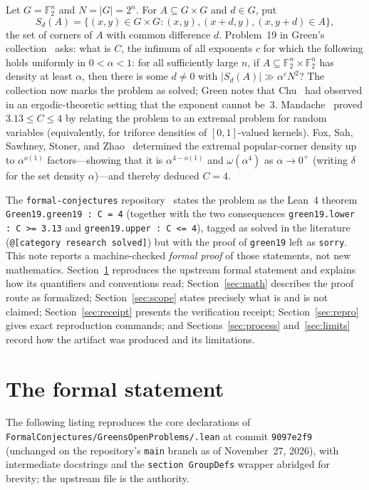 \documentclass[11pt,reqno]{amsart}
\theoremstyle{remark}
\newcommand{\F}{\mathbb{F}}
\newcommand{\LeanUS}{\textunderscore\hspace{0pt}}
\newcommand{\lean}[1]{{\let\_\LeanUS\texttt{#1}}}
\begin{document}
Let $G = \F_2^n$ and $N = |G| = 2^n$. For $A \subseteq G \times G$ and $d \in G$, put
\[
  S_d(A) = \{(x, y) \in G \times G : (x, y), (x + d, y), (x, y + d) \in A\},
\]
the set of corners of $A$ with common difference $d$. Problem~19 in Green's collection~\cite{Green} asks: what is $C$, the infimum of all exponents $c$ for which the following holds uniformly in $0 < \alpha < 1$: for all sufficiently large $n$, if $A \subseteq \F_2^n \times \F_2^n$ has density at least $\alpha$, then there is some $d \neq 0$ with $|S_d(A)| \gg \alpha^c N^2$? The collection now marks the problem as solved; Green notes that Chu~\cite{Chu} had observed in an ergodic-theoretic setting that the exponent cannot be~$3$. Mandache~\cite{Mandache} proved $3.13 \le C \le 4$ by relating the problem to an extremal problem for random variables (equivalently, for triforce densities of $[0, 1]$-valued kernels). Fox, Sah, Sawhney, Stoner, and Zhao~\cite{FSSSZ} determined the extremal popular-corner density up to $\alpha^{o(1)}$ factors---showing that it is $\alpha^{4 - o(1)}$ and $\omega(\alpha^4)$ as $\alpha \to 0^+$ (writing $\delta$ for the set density $\alpha$)---and thereby deduced $C = 4$.

The \lean{formal-conjectures} repository~\cite{FC} states the problem as the Lean~4 theorem \lean{Green19.\allowbreak{}\allowbreak green\_19 : C = 4} (together with the two consequences \lean{green\_19.\allowbreak{}lower : C >= 3.13} and \lean{green\_19.\allowbreak{}upper : C <= 4}), tagged as solved in the literature (\lean{@[category research solved]}) but with the proof of \lean{green\_19} left as \lean{sorry}. This note reports a machine-checked \emph{formal proof} of those statements, not new mathematics. Section~\ref{sec:statement} reproduces the upstream formal statement and explains how its quantifiers and conventions read; Section~\ref{sec:math} describes the proof route as formalized; Section~\ref{sec:scope} states precisely what is and is not claimed; Section~\ref{sec:receipt} presents the verification receipt; Section~\ref{sec:repro} gives exact reproduction commands; and Sections~\ref{sec:process} and~\ref{sec:limits} record how the artifact was produced and its limitations.

\section{The formal statement}\label{sec:statement}

The following listing reproduces the core declarations of \lean{FormalConjectures/\allowbreak{}\allowbreak GreensOpenProblems/\allowbreak{}\allowbreak 19.\allowbreak{}lean} at commit \lean{9097e2f9} (unchanged on the repository's \lean{main} branch as of November~27, 2026), with intermediate docstrings and the \lean{section GroupDefs} wrapper abridged for brevity; the upstream file is the authority.
\end{document}
